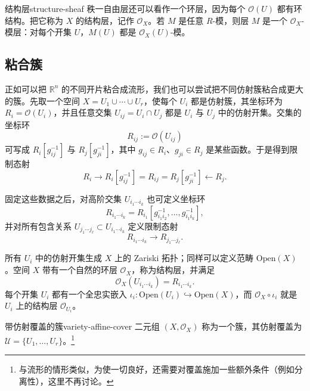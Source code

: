 \begin{definition}{结构层}{structure-sheaf}
秩一自由层还可以看作一个环层，因为每个 $\mathcal O(U)$ 都有环结构。把它称为 $X$ 的结构层，记作 $\mathcal O_X$。若 $M$ 是任意 $R$-模，则层 $M$ 是一个 $\mathcal O_X$-模层：对每个开集 $U$，$M(U)$ 都是 $\mathcal O_X(U)$-模。
\end{definition}

\subsection{粘合簇}\label{subsec:gluing-varieties}
正如可以把 $\mathbb R^n$ 的不同开片粘合成流形，我们也可以尝试把不同仿射簇粘合成更大的簇。先取一个空间 $X=U_1\cup\cdots\cup U_r$，使每个 $U_i$ 都是仿射簇，其坐标环为 $R_i=\mathcal O(U_i)$，并且任意交集 $U_{ij}=U_i\cap U_j$ 都是 $U_i$ 与 $U_j$ 中的仿射开集。交集的坐标环
\[
  R_{ij}:=\mathcal O(U_{ij})
\]
可写成 $R_i[g_{ij}^{-1}]$ 与 $R_j[g_{ji}^{-1}]$，其中 $g_{ij}\in R_i$、$g_{ji}\in R_j$ 是某些函数。于是得到限制态射
\[
  R_i\longrightarrow R_i[g_{ij}^{-1}]
  =R_{ij}=R_j[g_{ji}^{-1}]\longleftarrow R_j.
\]

固定这些数据之后，对高阶交集 $U_{i_1\cdots i_k}$ 也可定义坐标环
\[
  R_{i_1\cdots i_k}
  =R_{i_1}[g_{i_1i_2}^{-1},\ldots,g_{i_1i_k}^{-1}],
\]
并对所有包含关系 $U_{j_1\cdots j_\ell}\subset U_{i_1\cdots i_k}$ 定义限制态射
\[
  R_{i_1\cdots i_k}\longrightarrow R_{j_1\cdots j_\ell}.
\]

所有 $U_i$ 中的仿射开集生成 $X$ 上的 Zariski 拓扑；同样可以定义范畴 $\mathrm{Open}(X)$。空间 $X$ 带有一个自然的环层 $\mathcal O_X$，称为结构层，并满足
\[
  \mathcal O_X(U_{i_1\cdots i_k})=R_{i_1\cdots i_k}.
\]
每个开集 $U_i$ 都有一个全忠实嵌入 $\iota_i\colon\mathrm{Open}(U_i)\hookrightarrow\mathrm{Open}(X)$，而 $\mathcal O_X\circ\iota_i$ 就是 $U_i$ 上的结构层 $\mathcal O_{U_i}$。

\begin{definition}{带仿射覆盖的簇}{variety-affine-cover}
二元组 $(X,\mathcal O_X)$ 称为一个簇，其仿射覆盖为 $\mathcal U=\{U_1,\ldots,U_r\}$。\footnote{与流形的情形类似，为使一切良好，还需要对覆盖施加一些额外条件（例如分离性），这里不再讨论。}
\end{definition}

